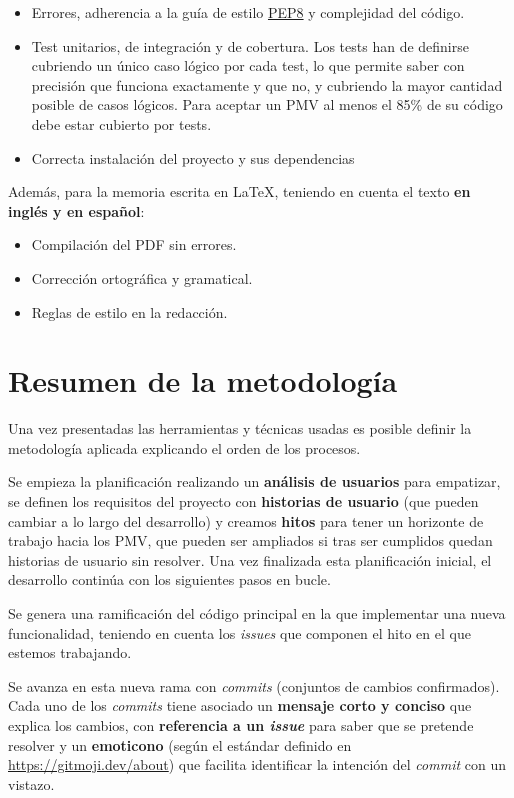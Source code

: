 \begin{itemize}
	\item{Errores, adherencia a la guía de estilo \href{https://peps.python.org/pep-0008/}{PEP8} y complejidad del código.}
	\item{Test unitarios, de integración y de cobertura. Los tests han de definirse cubriendo un único caso lógico por cada test, lo que permite saber con precisión que funciona exactamente y que no, y cubriendo la mayor cantidad posible de casos lógicos. Para aceptar un PMV al menos el 85\% de su código debe estar cubierto por tests.}
	\item{Correcta instalación del proyecto y sus dependencias}
\end{itemize}

Además, para la memoria escrita en LaTeX, teniendo en cuenta el texto \textbf{en inglés y en español}:
\begin{itemize}
	\item{Compilación del PDF sin errores.}
	\item{Corrección ortográfica y gramatical.}
	\item{Reglas de estilo en la redacción.}
\end{itemize}


\section{Resumen de la metodología}

Una vez presentadas las herramientas y técnicas usadas es posible definir la metodología aplicada explicando el orden de los procesos.

Se empieza la planificación realizando un \textbf{análisis de usuarios} para empatizar, se definen los requisitos del proyecto con \textbf{historias de usuario} (que pueden cambiar a lo largo del desarrollo) y creamos \textbf{hitos} para tener un horizonte de trabajo hacia los PMV, que pueden ser ampliados si tras ser cumplidos quedan historias de usuario sin resolver. Una vez finalizada esta planificación inicial, el desarrollo continúa con los siguientes pasos en bucle. 

Se genera una ramificación del código principal en la que implementar una nueva funcionalidad, teniendo en cuenta los \textit{issues} que componen el hito en el que estemos trabajando.

Se avanza en esta nueva rama con \textit{commits} (conjuntos de cambios confirmados). Cada uno de los \textit{commits} tiene asociado un \textbf{mensaje corto y conciso} que explica los cambios, con \textbf{referencia a un \textit{issue}} para saber que se pretende resolver y un \textbf{emoticono} (según el estándar definido en \url{https://gitmoji.dev/about}) que facilita identificar la intención del \textit{commit} con un vistazo.

